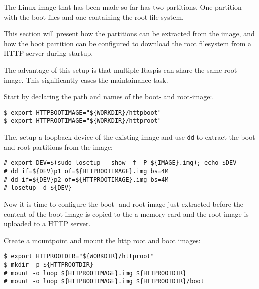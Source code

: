 \label{sec:testbed_http}


The Linux image that has been made so far has two partitions. One
partition with the boot files and one containing the root file system.

This section will present how the partitions can be extracted from the image,
and how the boot partition can be configured to download the root filesystem
from a \ac{HTTP} server during startup.

The advantage of this setup is that multiple \ac{Raspi}s can share the same
root image. This significantly eases the maintainance task.


%
%
%
%
%
%

Start by declaring the path and names of the boot- and root-image:.
\begin{lstlisting}[]
$ export HTTPBOOTIMAGE="${WORKDIR}/httpboot"
$ export HTTPROOTIMAGE="${WORKDIR}/httproot"
\end{lstlisting}
\FloatBarrier
\vspace{-5mm}

The, setup a loopback device of the existing image and use \texttt{dd} to
extract the boot and root partitions from the image:
\begin{lstlisting}[]
# export DEV=$(sudo losetup --show -f -P ${IMAGE}.img); echo $DEV
# dd if=${DEV}p1 of=${HTTPBOOTIMAGE}.img bs=4M
# dd if=${DEV}p2 of=${HTTPROOTIMAGE}.img bs=4M
# losetup -d ${DEV}
\end{lstlisting}
\FloatBarrier
\vspace{-5mm}

Now it is time to configure the boot- and root-image just extracted before
the content of the boot image is copied to the a memory card and the root
image is uploaded to a \ac{HTTP} server.

Create a mountpoint and mount the http root and boot images:
\begin{lstlisting}[]
$ export HTTPROOTDIR="${WORKDIR}/httproot"
$ mkdir -p ${HTTPROOTDIR}
# mount -o loop ${HTTPROOTIMAGE}.img ${HTTPROOTDIR}
# mount -o loop ${HTTPBOOTIMAGE}.img ${HTTPROOTDIR}/boot
\end{lstlisting}
\FloatBarrier
\vspace{-5mm}

